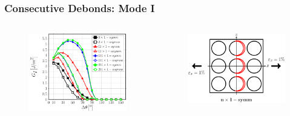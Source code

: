 \documentclass[first,firstsupp,lastsupp,last,hyperref,table]{ETHclass}
\begin{document}
\begin{frame}
\frametitle{\vspace{0.2cm}\small Consecutive Debonds: Mode I}
\vspace{-0.5cm}
\centering
\begin{columns}
\centering
\begin{column}{0.65\textwidth}
\centering
\begin{figure}
\centering
\includegraphics[width=\columnwidth]{nx1-coupling-vf60-GI.pdf}
\end{figure}
\end{column}
\begin{column}{0.35\textwidth}
\centering
\begin{figure}
\centering
\includegraphics[width=\columnwidth]{twofibers-sameside-dtheta100.pdf}

\end{figure}
\end{column}
\end{columns}
\end{frame}
\end{document}
